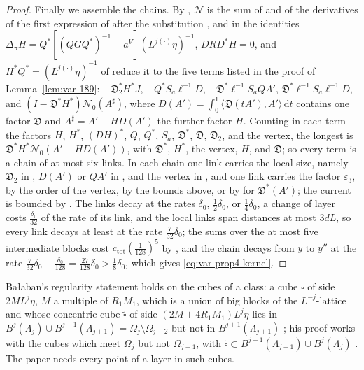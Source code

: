 \documentclass[11pt]{preprint}
\newcommand{\dd}{\mathrm{d}}
\numberwithin{equation}{section}
\theoremstyle{definition}
\theoremstyle{remark}
\theoremstyle{plain}
\begin{document}
\begin{proof}
Finally we assemble the chains. By \cite[(80)]{BalabanVAR}, $\mathcal N$ is the sum of \cite[(85), (88), (89), (90)]{BalabanVAR} and of the derivatives of the first expression of \cite[(39)]{BalabanVAR} after the substitution \cite[(47)]{BalabanVAR}, and in \cite[(88), (89)]{BalabanVAR} the identities $\Delta_\pi H = Q^*[(QGQ^*)^{-1} - a^V](L^{j(\cdot)}\eta)^{-1}$, $DRD^*H = 0$, and $H^*Q^* = (L^{j(\cdot)}\eta)^{-1}$ of \cite[(45), (87)]{BalabanVAR} reduce it to the five terms listed in the proof of Lemma~\ref{lem:var-189}: $-\mathfrak D_2^*H^*J$, $-Q^*S_a\ell^{-1}D$, $-\mathfrak D^*\ell^{-1}S_aQA'$, $\mathfrak D^*\ell^{-1}S_a\ell^{-1}D$, and $(I - \mathfrak D^*H^*)\mathcal N_0(A^\sharp)$, where $D(A') = \int_0^1\langle\mathfrak D(tA'), A'\rangle\,\dd t$ contains one factor $\mathfrak D$ and $A^\sharp = A' - HD(A')$ the further factor $H$. Counting in each term the factors $H$, $H^*$, $(DH)^*$, $Q$, $Q^*$, $S_a$, $\mathfrak D^*$, $\mathfrak D$, $\mathfrak D_2$, and the vertex, the longest is $\mathfrak D^*H^*\mathcal N_0(A' - HD(A'))$, with $\mathfrak D^*$, $H^*$, the vertex, $H$, and $\mathfrak D$; so every term is a chain of at most six links. In each chain one link carries the local size, namely $\mathfrak D_2$ in \cite[(85)]{BalabanVAR}, $D(A')$ or $QA'$ in \cite[(88), (89)]{BalabanVAR}, and the vertex in \cite[(90)--(96)]{BalabanVAR}, and one link carries the factor $\varepsilon_3$, by the order of the vertex, by the bounds above, or by \cite[(73)]{BalabanVAR} for $\mathfrak D^*(A')$; the current is bounded by \cite[(86)]{BalabanVAR}. The links decay at the rates $\delta_0$, $\frac12\delta_0$, or $\frac14\delta_0$, a change of layer costs $\frac{\delta_0}{32}$ of the rate of its link, and the local links span distances at most $3dL$, so every link decays at least at the rate $\frac{7}{32}\delta_0$; the sums over the at most five intermediate blocks cost $c_{\mathrm{tot}}(\frac1{128})^5$ by \cite[(2.58)--(2.59)]{BalabanPRT2}, and the chain decays from $y$ to $y''$ at the rate $\frac{7}{32}\delta_0 - \frac{\delta_0}{128} = \frac{27}{128}\delta_0 > \frac18\delta_0$, which gives \eqref{eq:var-prop4-kernel}.
\end{proof}

Ba{\l}aban's regularity statement \cite[Theorem~1, p.~279]{BalabanVAR} holds on the cubes of a class: a cube $\square$ of side $2ML^j\eta$, $M$ a multiple of $R_1M_1$, which is a union of big blocks of the $L^{-j}$-lattice and whose concentric cube $\tilde\square$ of side $(2M + 4R_1M_1)L^j\eta$ lies in $B^j(\Lambda_j) \cup B^{j+1}(\Lambda_{j+1}) = \Omega_j \setminus \Omega_{j+2}$ but not in $B^{j+1}(\Lambda_{j+1})$ \cite[p.~279, ll.~2--4]{BalabanVAR}; his proof works with the cubes which meet $\Omega_j$ but not $\Omega_{j+1}$, with $\tilde\square \subset B^{j-1}(\Lambda_{j-1}) \cup B^j(\Lambda_j)$ \cite[p.~300, ll.~28--37]{BalabanVAR}. The paper needs every point of a layer in such cubes.
\end{document}
